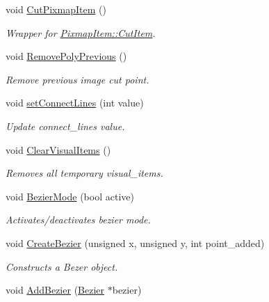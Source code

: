 \begin{DoxyCompactItemize}
void \mbox{\hyperlink{classOwnGraphicsScene_a7e3d97c27cca1df796b75cc4a99e24cd}{Cut\+Pixmap\+Item}} ()
\begin{DoxyCompactList}\small\item\em Wrapper for \mbox{\hyperlink{classPixmapItem_a4a742318dce01d018da2f4b01790c210}{Pixmap\+Item\+::\+Cut\+Item}}. \end{DoxyCompactList}\item 
void \mbox{\hyperlink{classOwnGraphicsScene_a4976a8e6f682612acd3e23b6c98bd8d8}{Remove\+Poly\+Previous}} ()
\begin{DoxyCompactList}\small\item\em Remove previous image cut point. \end{DoxyCompactList}\item 
void \mbox{\hyperlink{classOwnGraphicsScene_ad62254e1884fa4817ff1beaa3bc6c011}{set\+Connect\+Lines}} (int value)
\begin{DoxyCompactList}\small\item\em Update connect\+\_\+lines value. \end{DoxyCompactList}\item 
void \mbox{\hyperlink{classOwnGraphicsScene_a158c6430ca8e07642b693e37ec05119e}{Clear\+Visual\+Items}} ()
\begin{DoxyCompactList}\small\item\em Removes all temporary visual\+\_\+items. \end{DoxyCompactList}\item 
\mbox{\label{classOwnGraphicsScene_a8d2bbcfd1b3d28ca45802e53b046fe49}} 
void \mbox{\hyperlink{classOwnGraphicsScene_a8d2bbcfd1b3d28ca45802e53b046fe49}{Bezier\+Mode}} (bool active)
\begin{DoxyCompactList}\small\item\em Activates/deactivates bezier mode. \end{DoxyCompactList}\item 
void \mbox{\hyperlink{classOwnGraphicsScene_a9c03d25db8eef3116adbaeba1fc9c4dc}{Create\+Bezier}} (unsigned x, unsigned y, int point\+\_\+added)
\begin{DoxyCompactList}\small\item\em Constructs a Bezer object. \end{DoxyCompactList}\item 
void \mbox{\hyperlink{classOwnGraphicsScene_ac0c5440d16675d6bf8c27767d2721622}{Add\+Bezier}} (\mbox{\hyperlink{classBezier}{Bezier}} $\ast$bezier)

\end{DoxyCompactItemize}
